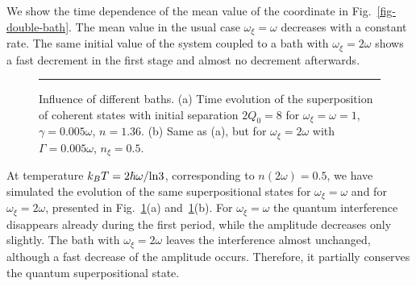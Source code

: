 \documentclass[12pt,twoside,a4paper]{report}
\begin{document}



We show the time dependence of the mean value of the coordinate
in Fig.~\ref{fig-double-bath}. The mean value in 
the usual case $\omega_\xi=\omega $ decreases with a constant rate.
The same initial value of the system coupled to a 
bath with $\omega_\xi=2 \omega$ shows a fast decrement 
in the first stage and almost no decrement
afterwards.




\footnotesize\begin{figure}[!h]\centering
  \parbox{10cm}
  {\rule{-3cm}{0cm}
\epsfxsize=16cm}
\caption[Influence of different baths. Dynamics of wave packets]
{\small  Influence of different baths.
  (a) Time evolution of the superposition of coherent states 
  with initial separation $2Q_0=8$ 
  for $\omega_\xi=\omega =1$, $\gamma= 0.005\omega$, 
  $n=1.36$.
  (b) Same as (a), but for $\omega_\xi=2 \omega$ with
  $\Gamma=0.005\omega$, $n_\xi=0.5$.
\label{fig-double-bath-w}
}
\end{figure}\normalsize
%
At temperature $k_B T = 2 \hbar \omega / {\rm ln}3$, corresponding to
$n(2\omega)=0.5$, we have simulated the evolution of the same
superpositional states for $\omega_\xi=\omega$ and for
$\omega_\xi=2\omega$, presented in Fig.~\ref{fig-double-bath-w}(a) 
and~\ref{fig-double-bath-w}(b).  For $\omega_\xi=\omega $
the quantum interference disappears already
during the first period, while the amplitude decreases only slightly.
The bath with $\omega_\xi=2\omega$ leaves the interference almost
unchanged, although a fast decrease of the amplitude occurs.
Therefore, it partially conserves the quantum superpositional state.

\end{document}
